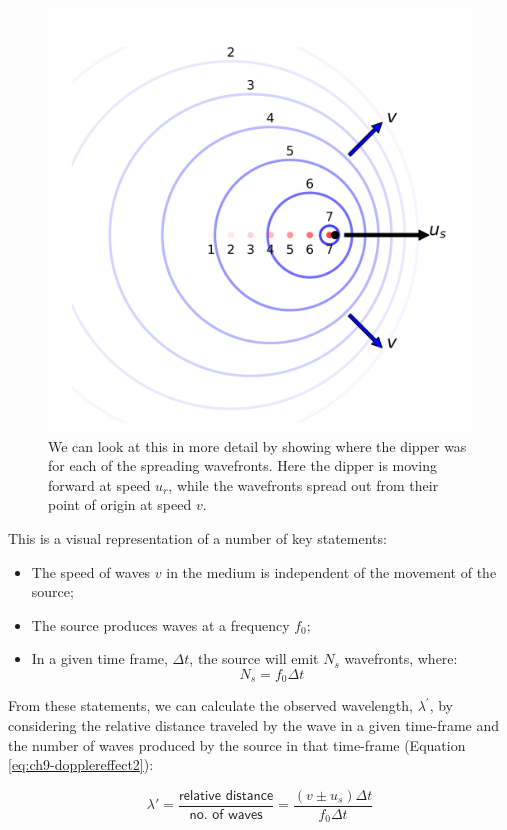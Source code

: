 \documentclass[
]{book}
\providecommand{\tightlist}{%
  \setlength{\itemsep}{0pt}\setlength{\parskip}{0pt}}
\begin{document}
\begin{figure}

{\centering \includegraphics[width=0.7\linewidth]{visualisations/ch9-doppler2} 

}

\caption{We can look at this in more detail by showing where the dipper was for each of the spreading wavefronts. Here the dipper is moving forward at speed $u_r$, while the wavefronts spread out from their point of origin at speed $v$.}\label{fig:ch9-dopplerdipper2}
\end{figure}

This is a visual representation of a number of key statements:

\begin{itemize}
\tightlist
\item
  The speed of waves \(v\) in the medium is independent of the movement of the source;
\item
  The source produces waves at a frequency \(f_0\);
\item
  In a given time frame, \(\Delta t\), the source will emit \(N_s\) wavefronts, where:
  \begin{equation}
  N_s = f_0 \Delta t
  \end{equation}
\end{itemize}

From these statements, we can calculate the observed wavelength, \(\lambda^\prime\), by considering the relative distance traveled by the wave in a given time-frame and the number of waves produced by the source in that time-frame (Equation \eqref{eq:ch9-dopplereffect2}):

\begin{equation}
\lambda' = \frac{\textsf{relative distance}}{\textsf{no. of waves}} = \frac{(v\pm u_{s})\Delta t}{f_{0}\Delta t}
\label{eq:ch9-dopplereffect2}
\end{equation}
\end{document}
